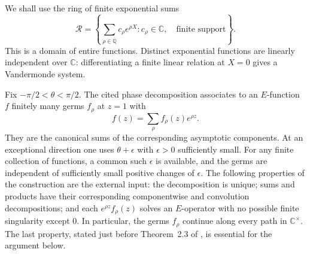 \documentclass[11pt,a4paper]{article}
\numberwithin{equation}{section}
\theoremstyle{definition}
\theoremstyle{remark}
\newcommand{\A}{\overline{\mathbb Q}}
\begin{document}
We shall use the ring of finite exponential sums
\begin{equation}\label{gf:R}
 \mathcal R=\left\{
       \sum_{\rho\in\A}c_\rho e^{\rho X}:
       c_\rho\in\mathbb C,\quad\text{finite support}
                         \right\}.
\end{equation}
This is a domain of entire functions.  Distinct exponential functions
are linearly independent over $\mathbb C$: differentiating a finite
linear relation at $X=0$ gives a Vandermonde system.

Fix $-\pi/2<\theta<\pi/2$.  The cited phase decomposition associates to
an $E$-function $f$ finitely many germs $f_\rho$ at $z=1$ with
\begin{equation}\label{gf:phase-decomp}
 f(z)=\sum_\rho f_\rho(z)e^{\rho z}.
\end{equation}
They are the canonical sums of the corresponding asymptotic components.
At an exceptional direction one uses $\theta+\epsilon$ with
$\epsilon>0$ sufficiently small.  For any finite collection of
functions, a common such $\epsilon$ is available, and the germs are
independent of sufficiently small positive changes of $\epsilon$.
The following properties of the construction are the external input:
the decomposition is unique; sums and products have their corresponding
componentwise and convolution decompositions; and each
$e^{\rho z}f_\rho(z)$ solves an $E$-operator with no possible finite
singularity except $0$.  In particular, the germs $f_\rho$ continue along
every path in $\mathbb C^\times$.  The last property, stated just before
Theorem~2.3 of \cite{FR2026}, is essential for the argument below.
\end{document}
